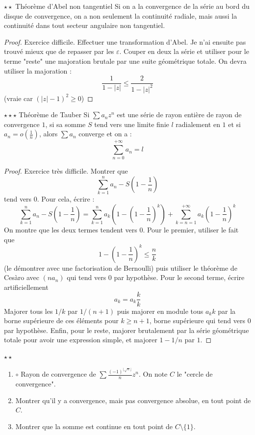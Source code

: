 \documentclass[french,a4paper]{article}
\theoremstyle{plain}
\theoremstyle{definition}
\theoremstyle{remark}
\begin{document}
\begin{ex}[Moulin.SE.55]{$\star\star$ Théorème d'Abel non tangentiel}
	Si on a la convergence de la série au bord du disque de convergence, on a non seulement la continuité radiale, mais aussi la continuité dans tout secteur angulaire non tangentiel.
\end{ex}
\begin{proof}
	Exercice difficile.
	Effectuer une transformation d'Abel. Je n'ai ensuite pas trouvé mieux que de repasser par les $\varepsilon$. Couper en deux la série et utiliser pour le terme "reste" une majoration brutale par une suite géométrique totale. On devra utiliser la majoration : $$\frac{1}{1-\lvert z\rvert}\leqslant\frac{2}{1-\lvert z\rvert^2}$$ (vraie car $(\lvert z\rvert -1)^2\geqslant0$)
\end{proof}

\begin{ex}[Moulin.SE.56]{$\star\star\star$ Théorème de Tauber}
	Si $\sum a_nz^n$ est une série de rayon entière de rayon de convergence $1$, si sa somme $S$ tend vers une limite finie $l$ radialement en $1$ et si $a_n=\displaystyle o\left(\frac{1}{n}\right)$, alors $\sum a_n$ converge et on a : $$\sum_{n=0}^{+\infty} a_n=l$$
\end{ex}
\begin{proof}
	Exercice très difficile. Montrer que $$\sum_{k=1}^{n}a_n-S\left(1-\frac{1}{n}\right)$$ tend vers $0$. Pour cela, écrire : $$\sum_{k=1}^{n}a_n-S\left(1-\frac{1}{n}\right)=\sum_{k=1}^{n}a_k\left(1-\left(1-\frac{1}{n}\right)^k\right)+\sum_{k=n=1}^{+\infty}a_k\left(1-\frac{1}{n}\right)^k$$ On montre que les deux termes tendent vers 0. Pour le premier, utiliser le fait que $$1-\left(1-\frac{1}{n}\right)^k\leqslant \frac{n}{k}$$ (le démontrer avec une factorisation de Bernoulli) puis utiliser le théorème de Cesàro avec $(na_n)$ qui tend vers $0$ par hypothèse. Pour le second terme, écrire artificiellement $$a_k=a_k\frac{k}{k}$$ Majorer tous les $1/k$ par $1/(n+1)$ puis majorer en module tous $a_kk$ par la borne supérieure de ces éléments pour $k\geqslant n+1$, borne supérieure qui tend vers $0$ par hypothèse. Enfin, pour le reste, majorer brutalement par la série géométrique totale pour avoir une expression simple, et majorer $1-1/n$ par $1$.
\end{proof}

\begin{ex}[Moulin.SE.57]{$\star\star$}
	\begin{enumerate}
		\item $\circ$ Rayon de convergence de $\displaystyle\sum\frac{(-1)^{\lfloor\sqrt{n}\rfloor}}{n}z^n$. On note $C$ le "cercle de convergence".
		\item Montrer qu'il y a convergence, mais pas convergence absolue, en tout point de $C$.
		\item Montrer que la somme est continue en tout point de $C\setminus\{1\}$.
	\end{enumerate}
\end{ex}
\end{document}
